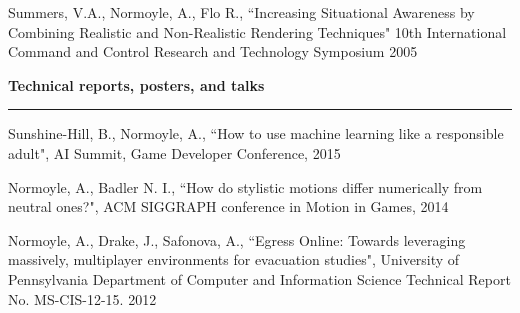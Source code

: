 Summers, V.A., Normoyle, A., Flo R., ``Increasing Situational Awareness by Combining Realistic and Non-Realistic Rendering Techniques" 10th International Command and Control Research and Technology Symposium 2005

\medskip
\medskip

{\Large {\bf  Technical reports, posters, and talks}}
\vspace{0.1cm}
\hrule
\medskip

Sunshine-Hill, B., Normoyle, A., ``How to use machine learning like a responsible adult", AI Summit, Game Developer Conference, 2015

Normoyle, A., Badler N. I., ``How do stylistic motions differ numerically from neutral ones?", ACM SIGGRAPH conference in Motion in Games, 2014

Normoyle, A., Drake, J., Safonova, A., ``Egress Online: Towards leveraging massively, multiplayer environments for evacuation studies", University of Pennsylvania Department of Computer and Information Science Technical Report No. MS-CIS-12-15. 2012


